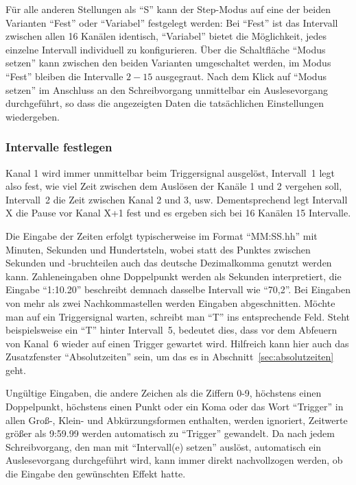 \documentclass[paper=a4, open=any]{scrbook}
\begin{document}
				Für alle anderen Stellungen als \enquote{S} kann der Step-Modus auf eine der beiden Varianten \enquote{Fest} oder \enquote{Variabel} festgelegt werden: Bei \enquote{Fest} ist das Intervall zwischen allen 16 Kanälen identisch, \enquote{Variabel} bietet die Möglichkeit, jedes einzelne Intervall individuell zu konfigurieren. Über die Schaltfläche \enquote{Modus setzen} kann zwischen den beiden Varianten umgeschaltet werden, im Modus \enquote{Fest} bleiben die Intervalle $2-15$ ausgegraut. Nach dem Klick auf \enquote{Modus setzen} im Anschluss an den Schreibvorgang unmittelbar ein Auslesevorgang durchgeführt, so dass die angezeigten Daten die tatsächlichen Einstellungen wiedergeben.				
				
			\subsubsection*{Intervalle festlegen}	
				
				Kanal 1 wird immer unmittelbar beim Triggersignal ausgelöst, Intervall~1 legt also fest, wie viel Zeit zwischen dem Auslösen der Kanäle 1 und 2 vergehen soll, Intervall~2 die Zeit zwischen Kanal 2 und 3, usw. Dementsprechend legt Intervall X die Pause vor Kanal X+1 fest und es ergeben sich bei 16 Kanälen 15 Intervalle.
				
				Die Eingabe der Zeiten erfolgt typischerweise im Format \enquote{MM:SS.hh} mit Minuten, Sekunden und Hundertsteln, wobei statt des Punktes zwischen Sekunden und -bruchteilen auch das deutsche Dezimalkomma genutzt werden kann. Zahleneingaben ohne Doppelpunkt werden als Sekunden interpretiert, die Eingabe \enquote{1:10.20} beschreibt demnach dasselbe Intervall wie \enquote{70,2}. Bei Eingaben von mehr als zwei Nachkommastellen werden Eingaben abgeschnitten. Möchte man auf ein Triggersignal warten, schreibt man \enquote{T} ins entsprechende Feld. Steht beispielsweise ein \enquote{T} hinter Intervall~5, bedeutet dies, dass vor dem Abfeuern von Kanal~6 wieder auf einen Trigger gewartet wird. Hilfreich kann hier auch das Zusatzfenster \enquote{Absolutzeiten} sein, um das es in Abschnitt~\ref{sec:absolutzeiten} geht.
				
				Ungültige Eingaben, die andere Zeichen als die Ziffern 0-9, höchstens einen Doppelpunkt, höchstens einen Punkt oder ein Koma oder das Wort \enquote{Trigger} in allen Groß-, Klein- und Abkürzungsformen enthalten, werden ignoriert, Zeitwerte größer als 9:59.99 werden automatisch zu \enquote{Trigger} gewandelt. Da nach jedem Schreibvorgang, den man mit \enquote{Intervall(e) setzen} auslöst, automatisch ein Auslesevorgang durchgeführt wird, kann immer direkt nachvollzogen werden, ob die Eingabe den gewünschten Effekt hatte.
				
\end{document}
